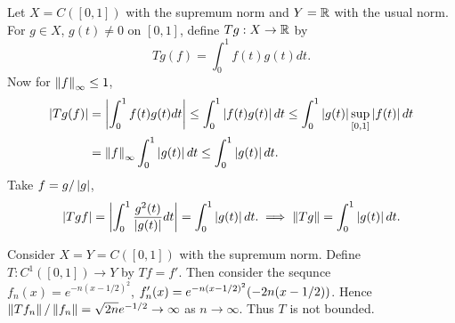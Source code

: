 \begin{example}
    Let $X = C([0,1])$ with the supremum norm and $Y = \mathbb{R}$ with 
    the usual norm. For $g\in X$, $g(t)\neq 0$ on $[0,1]$,
    define $Tg:X\to\mathbb{R}$ by 
    \begin{equation*}
        Tg(f) = \int_0^1 f(t)g(t)dt.
    \end{equation*}
    Now for $\left\lVert {f} \right\rVert_\infty \leq 1$, 
    \begin{equation*}
        \begin{split}
            \left\lvert {Tg(f)} \right\rvert &= \left\lvert {\int_{0}^{1}f(t)g(t)dt} \right\rvert 
            \leq \int_{0}^{1}\left\lvert {f(t)g(t)} \right\rvert dt 
            \leq \int_{0}^{1}\left\lvert {g(t)} \right\rvert\sup_{[0,1]}\left\lvert {f(t)} \right\rvert dt \\
            &= \left\lVert {f} \right\rVert_\infty\int_{0}^{1}\left\lvert {g(t)} \right\rvert dt 
            \leq \int_{0}^{1}\left\lvert {g(t)} \right\rvert dt.
        \end{split}
    \end{equation*}
    Take $f = g/\left\lvert {g} \right\rvert$, 
    \begin{equation*}
        \left\lvert {Tgf} \right\rvert = \left\lvert {\int_{0}^{1}\frac{g^2(t)}{\left\lvert {g(t)} \right\rvert}dt} \right\rvert 
        = \int_{0}^{1}\left\lvert {g(t)} \right\rvert dt. 
        \implies \left\lVert {Tg} \right\rVert = \int_{0}^{1}\left\lvert {g(t)} \right\rvert dt.
    \end{equation*}
\end{example}

\begin{example}
    Consider $X = Y = C([0,1])$ with the supremum norm. Define 
    $T:C^1([0,1])\to Y$ by $Tf = f'$. Then consider the sequnce 
    $f_n(x) = e^{-n(x-1/2)^2}$, $f_n'(x) = e^{-n(x-1/2)^2}\pth{-2n(x-1/2)}$. 
    Hence $\left\lVert {Tf_n} \right\rVert/\left\lVert {f_n} \right\rVert = \sqrt{2n}e^{-1/2}\to\infty$ 
    as $n\to\infty$. Thus $T$ is not bounded.  
\end{example} 